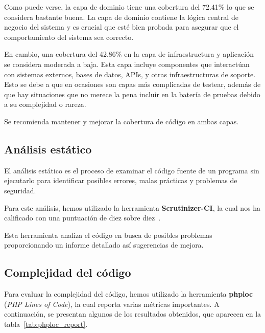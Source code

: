 Como puede verse, la capa de dominio tiene una cobertura del 72.41\% lo que se considera bastante buena.
La capa de dominio contiene la lógica central de negocio del sistema y es crucial que esté bien probada para asegurar
que el comportamiento del sistema sea correcto.

En cambio, una cobertura del 42.86\% en la capa de infraestructura y aplicación se considera moderada a baja.
Esta capa incluye componentes que interactúan con sistemas externos, bases de datos, APIs, y otras infraestructuras de
soporte.
Esto se debe a que en ocasiones son capas más complicadas de testear, además de que hay situaciones que no merece la
pena incluir en la batería de pruebas debido a su complejidad o rareza.

Se recomienda mantener y mejorar la cobertura de código en ambas capas.

\subsection{Análisis estático}

El análisis estático es el proceso de examinar el código fuente de un programa sin ejecutarlo para identificar posibles
errores, malas prácticas y problemas de seguridad.

Para este análisis, hemos utilizado la herramienta \textbf{Scrutinizer-CI}, la cual nos ha calificado con una puntuación
de diez sobre diez~\cite{url_scrutinizer_viu_84_proyecto}.

Esta herramienta analiza el código en busca de posibles problemas proporcionando un informe detallado así
sugerencias de mejora.


\subsection{Complejidad del código}

Para evaluar la complejidad del código, hemos utilizado la herramienta \textbf{phploc} (\textit{PHP Lines of Code}), la
cual reporta varias métricas importantes.
A continuación, se presentan algunos de los resultados obtenidos, que aparecen en la tabla~\ref{tab:phploc_report}.


